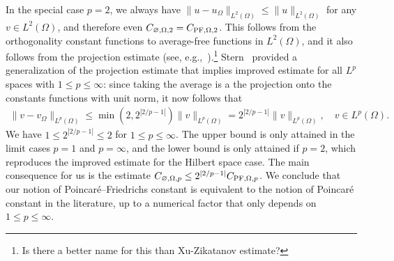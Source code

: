 \documentclass[a4paper]{article}
\begin{document}
In the special case $p=2$, we always have $\| u - u_\Omega \|_{L^{2}(\Omega)} \leq \| u \|_{L^{2}(\Omega)}$ for any $v \in L^{2}(\Omega)$,
and therefore even $C_{\varnothing,\Omega,2} = C_{{\rm PF},\Omega,2}$. 
This follows from the orthogonality constant functions to average-free functions in $L^2(\Omega)$,
and it also follows from the projection estimate (see, e.g.,~\cite{xu2003some}).\footnote{\color{red}Is there a better name for this than Xu-Zikatanov estimate?}
Stern~\cite{stern2015banach} provided a generalization of the projection estimate that implies improved estimate for all $L^p$ spaces with $1 \leq p \leq \infty$:
since taking the average is a the projection onto the constants functions with unit norm, it now follows that 
\begin{align*}
    \| v - v_\Omega \|_{L^{p}(\Omega)}
    \leq 
    \min\left( 2, 2^{|2/p-1|} \right)
    \| v \|_{L^{p}(\Omega)}
    = 
    2^{|2/p-1|} 
    \| v \|_{L^{p}(\Omega)}
    ,
    \quad 
    v \in L^p(\Omega)
    .
\end{align*}
We have $1 \leq 2^{|2/p-1|} \leq 2$ for $1 \leq p \leq \infty$.
The upper bound is only attained in the limit cases $p = 1$ and $p = \infty$, and the lower bound is only attained if $p = 2$, which reproduces the improved estimate for the Hilbert space case.
The main consequence for us is the estimate 
$C_{\varnothing,\Omega,p} \leq 2^{|2/p-1|} C_{{\rm PF},\Omega,p}$.
We conclude that our notion of Poincar\'e--Friedrichs constant is equivalent to the notion of Poincar\'e constant in the literature, up to a numerical factor that only depends on $1 \leq p \leq \infty$.
\end{document}
